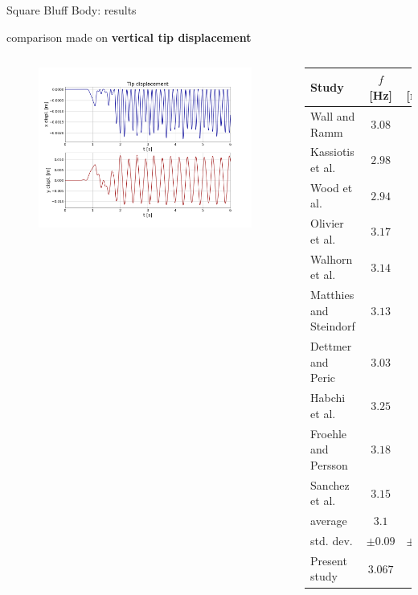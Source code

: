 \documentclass[10pt,t]{beamer}
\begin{document}
\begin{frame}{Square Bluff Body: results}

comparison made on \textbf{vertical tip displacement}

\vspace{0.8cm}

\begin{columns}




\begin{figure}[htbp!]
    \vspace{-2.2cm}
	\centering
	\includegraphics[width=0.98\textwidth, trim=20 20 20 50, clip]{images/sq-cyl/disp_sq_pres.png}
\end{figure}

\scriptsize
		\begin{tabular}{ l | c  c } 
			Study & $f$ [Hz] & $d_{y}$ [mm]   \\ 
			\hline
            Wall and Ramm & $3.08$ & $13.1$ \\
            Kassiotis et al.& $2.98$ & $10.5$ \\
            Wood et al. & $2.94$ & $11.5$ \\
            Olivier et al. & $3.17$ & $9.5$ \\
            Walhorn et al. & $3.14$ & $10.2$ \\
            Matthies and Steindorf  & $3.13$ & $11.8$ \\ 
            Dettmer and Peric & $3.03$ & $12.5$ \\
            Habchi et al. & $3.25$ & $10.2$ \\
            Froehle and Persson  & $3.18$ & $11.2$ \\
            Sanchez et al. & $3.15$ & $11.5$ \\
            \hline
            \cellcolor{green!10}average &\cellcolor{green!10} $3.1$ &\cellcolor{green!10} $11.2$\\
            \cellcolor{green!10}std. dev. &\cellcolor{green!10} $\pm0.09$ &\cellcolor{green!10} $\pm1.06$\\ 
            \hline
            Present study    & $3.067$ & $11.2$ \\
            

\end{tabular}
\end{columns}
\end{frame}
\end{document}
